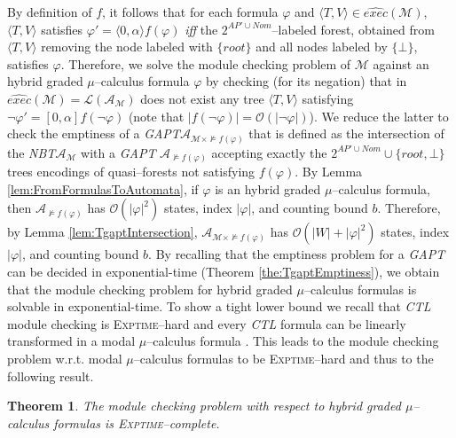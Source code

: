\documentclass{LMCS}
\theoremstyle{plain}
\def \A             {\mathcal{A}}
\def \CTL           {\emph{CTL}\xspace}
\def \EXPTIME       {\textsc{Exptime}\xspace}
\def \GAPT          {\emph{GAPT}\xspace}
\def \L             {\mathcal{L}}
\def \M             {\mathcal{M}}
\def \NBT           {\emph{NBT}\xspace}
\def \node          {V}
\def \rr            {\mathit{root}}
\newcommand \tpl[1] {\langle #1 \rangle}
\newtheorem{theorem}{Theorem}
\begin{document}
By definition of $f$, it follows that for each formula $\varphi$
and $\tpl{T,\node} \in \widehat{exec}(\M)$, $\tpl{T,\node}$
satisfies $\varphi'=\tpl{0,\alpha}f(\varphi)$ \emph{iff} the
$2^{AP'\cup Nom}$--labeled forest, obtained from $\tpl{T,V}$
removing the node labeled with $\{\rr\}$ and all nodes labeled by
$\{\bot\}$, satisfies $\varphi$. Therefore, we solve the module
checking problem of $\M$ against an hybrid graded $\mu$--calculus
formula $\varphi$ by checking (for its negation) that in
$\widehat{exec}(\M) = \L(\A_{\M})$ does not exist any tree
$\tpl{T,\node}$ satisfying $\neg \varphi'=[0,\alpha]f(\neg
\varphi)$ (note that $|f(\neg \varphi)| =
\mathcal{O}(|\neg\varphi|)$). We reduce the latter to check the
emptiness of a \GAPT $\A_{\M \times \not\models f(\varphi)}$ that
is defined as the intersection of the \NBT $\A_{\M}$ with a \GAPT
$\A_{\not \models f(\varphi)}$ accepting exactly the $2^{AP'\cup
Nom} \cup \{\rr,\bot\}$ trees encodings of quasi--forests not
satisfying $f(\varphi)$. By Lemma
\ref{lem:FromFormulasToAutomata}, if $\varphi$ is an hybrid graded
$\mu$--calculus formula, then $\A_{\not \models f(\varphi)}$ has
$\mathcal{O}(|\varphi|^2)$ states, index $|\varphi|$, and counting
bound $b$. Therefore, by Lemma \ref{lem:TgaptIntersection},
$\A_{\M\times\not\models f(\varphi)}$ has
$\mathcal{O}(|W|+|\varphi|^2)$ states, index $|\varphi|$, and
counting bound $b$. By recalling that the emptiness problem for a
\GAPT can be decided in exponential-time (Theorem
\ref{the:TgaptEmptiness}), we obtain that the module checking
problem for hybrid graded $\mu$--calculus formulas is solvable in
exponential-time. To show a tight lower bound we recall that \CTL
module checking is \EXPTIME--hard \cite{KVW01} and every \CTL
formula can be linearly transformed in a modal $\mu$--calculus
formula \cite{Jur98}. This leads to the module checking problem
w.r.t. modal $\mu$--calculus formulas to be \EXPTIME--hard and
thus to the following result.

\begin{theorem}\label{the:HybridGradedFiniteStatesModuleChecking}
The module checking problem with respect to hybrid graded
$\mu$--calculus formulas is \EXPTIME--complete.
\end{theorem}
\end{document}
